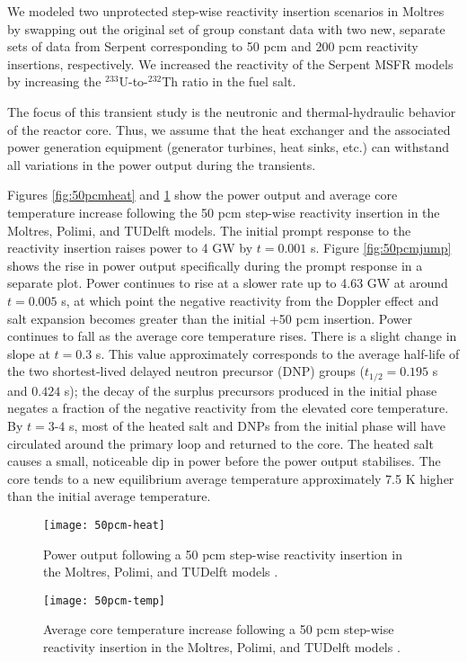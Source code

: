 We modeled two unprotected step-wise reactivity insertion scenarios in Moltres
by swapping out the original set of group constant data with two new, separate
sets of data from Serpent corresponding to 50 pcm and 200 pcm reactivity
insertions, respectively. We increased the reactivity of the Serpent
\gls{MSFR} models by increasing the $^{233}$U-to-$^{232}$Th ratio in the fuel
salt.

The focus of this transient study is the neutronic and thermal-hydraulic
behavior of the reactor core. Thus, we assume that the heat exchanger and the
associated power generation equipment (generator turbines, heat sinks, etc.)
can withstand all variations in the power output during the transients.

Figures \ref{fig:50pcmheat} and \ref{fig:50pcmtemp} show the power output and
average core temperature increase following the 50 pcm step-wise reactivity
insertion in the Moltres, Polimi, and TUDelft models. The initial prompt
response to the reactivity insertion raises power to 4 GW by $t=0.001$ s.
Figure \ref{fig:50pcmjump} shows the rise in power output specifically during
the prompt response in a separate plot.
Power continues to rise at a slower rate up to 4.63 GW at around $t=0.005$ s,
at which point the negative reactivity from the Doppler effect and salt
expansion becomes greater
than the initial +50 pcm insertion. Power continues to fall as the average
core temperature rises. There is a slight change in slope at $t=0.3$ s. This
value approximately corresponds to the average half-life of the two
shortest-lived delayed neutron precursor (DNP) groups ($t_{1/2}=0.195$ s and
$0.424$ s); the decay of the surplus precursors produced in the initial phase
negates a fraction of the negative reactivity from the elevated core
temperature. By $t=3$-$4$ s, most of the heated salt and \glspl{DNP} from the
initial phase will have circulated around the primary loop and returned to the
core. The heated salt causes a small, noticeable dip in power before the power
output stabilises. The core tends to a new equilibrium average temperature
approximately 7.5 K higher than the initial average temperature.

\begin{figure}[htbp!]
    \centering
    \texttt{[image: 50pcm-heat]}
    \caption{Power output following
    a 50 pcm step-wise reactivity insertion in the Moltres, Polimi, and
    TUDelft models \cite{fiorina_modelling_2014}.}
    \label{fig:50pcmheat}
%
    \centering
    \texttt{[image: 50pcm-temp]}
    \caption{Average core temperature increase following
    a 50 pcm step-wise reactivity insertion in the Moltres, Polimi, and
    TUDelft models \cite{fiorina_modelling_2014}.}
    \label{fig:50pcmtemp}
\end{figure}

